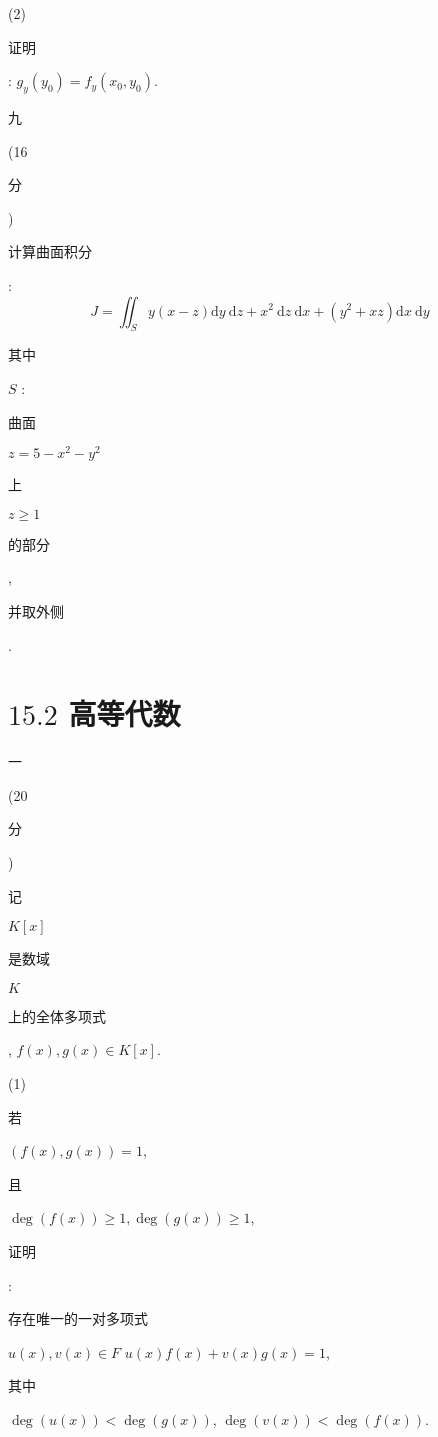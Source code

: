\documentclass[10pt]{article}
\begin{document}
(2) \begin{CJK}{UTF8}{mj}证明\end{CJK}: $g_{y}\left(y_{0}\right)=f_{y}\left(x_{0}, y_{0}\right)$.

\begin{CJK}{UTF8}{mj}九\end{CJK} (16 \begin{CJK}{UTF8}{mj}分\end{CJK}) \begin{CJK}{UTF8}{mj}计算曲面积分\end{CJK}:
$$
J=\iint_{S} y(x-z) \mathrm{d} y \mathrm{~d} z+x^{2} \mathrm{~d} z \mathrm{~d} x+\left(y^{2}+x z\right) \mathrm{d} x \mathrm{~d} y
$$
\begin{CJK}{UTF8}{mj}其中\end{CJK} $S$ : \begin{CJK}{UTF8}{mj}曲面\end{CJK} $z=5-x^{2}-y^{2}$ \begin{CJK}{UTF8}{mj}上\end{CJK} $z \geq 1$ \begin{CJK}{UTF8}{mj}的部分\end{CJK}, \begin{CJK}{UTF8}{mj}并取外侧\end{CJK}.

\section{$15.2$ 高等代数}
\begin{CJK}{UTF8}{mj}一\end{CJK} (20 \begin{CJK}{UTF8}{mj}分\end{CJK}) \begin{CJK}{UTF8}{mj}记\end{CJK} $K[x]$ \begin{CJK}{UTF8}{mj}是数域\end{CJK} $K$ \begin{CJK}{UTF8}{mj}上的全体多项式\end{CJK}, $f(x), g(x) \in K[x]$.

(1) \begin{CJK}{UTF8}{mj}若\end{CJK} $(f(x), g(x))=1$, \begin{CJK}{UTF8}{mj}且\end{CJK} $\operatorname{deg}(f(x)) \geq 1, \operatorname{deg}(g(x)) \geq 1$, \begin{CJK}{UTF8}{mj}证明\end{CJK}: \begin{CJK}{UTF8}{mj}存在唯一的一对多项式\end{CJK} $u(x), v(x) \in F$ $u(x) f(x)+v(x) g(x)=1$, \begin{CJK}{UTF8}{mj}其中\end{CJK} $\operatorname{deg}(u(x))<\operatorname{deg}(g(x))$, $\operatorname{deg}(v(x))<\operatorname{deg}(f(x))$.
\end{document}
